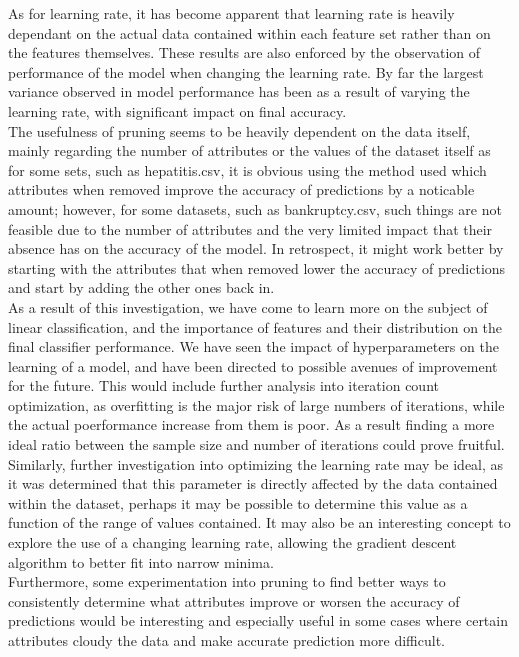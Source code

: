 As for learning rate, it has become apparent that learning rate is heavily dependant on the actual data contained within each feature set rather than on the features themselves. These results are also enforced by the observation of performance of the model when changing the learning rate. By far the largest variance observed in model performance has been as a result of varying the learning rate, with significant impact on final accuracy.\\

The usefulness of pruning seems to be heavily dependent on the data itself, mainly regarding the number of attributes or the values of the dataset itself as for some sets, such as hepatitis.csv, it is obvious using the method used which attributes when removed improve the accuracy of predictions by a noticable amount; however, for some datasets, such as bankruptcy.csv, such things are not feasible due to the number of attributes and the very limited impact that their absence has on the accuracy of the model. In retrospect, it might work better by starting with the attributes that when removed lower the accuracy of predictions and start by adding the other ones back in.\\

As a result of this investigation, we have come to learn more on the subject of linear classification, and the importance of features and their distribution on the final classifier performance. We have seen the impact of hyperparameters on the learning of a model, and have been directed to possible avenues of improvement for the future. This would include further analysis into iteration count optimization, as overfitting is the major risk of large numbers of iterations, while the actual poerformance increase from them is poor. As a result finding a more ideal ratio between the sample size and number of iterations could prove fruitful. Similarly, further investigation into optimizing the learning rate may be ideal, as it was determined that this parameter is directly affected by the data contained within the dataset, perhaps it may be possible to determine this value as a function of the range of values contained. It may also be an interesting concept to explore the use of a changing learning rate, allowing the gradient descent algorithm to better fit into narrow minima.\\

Furthermore, some experimentation into pruning to find better ways to consistently determine what attributes improve or worsen the accuracy of predictions would be interesting and especially useful in some cases where certain attributes cloudy the data and make accurate prediction more difficult.\\

